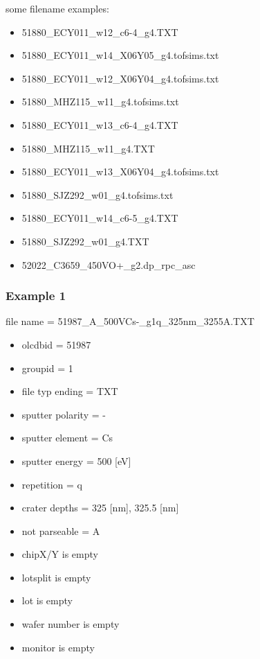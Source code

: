 \documentclass[a4paper,10pt]{article}
\begin{document}
some filename examples:
\begin{itemize}
 \item 51880\_ECY011\_w12\_c6-4\_g4.TXT            
 \item 51880\_ECY011\_w14\_X06Y05\_g4.tofsims.txt
 \item 51880\_ECY011\_w12\_X06Y04\_g4.tofsims.txt  
 \item 51880\_MHZ115\_w11\_g4.tofsims.txt
 \item 51880\_ECY011\_w13\_c6-4\_g4.TXT            
 \item 51880\_MHZ115\_w11\_g4.TXT
 \item 51880\_ECY011\_w13\_X06Y04\_g4.tofsims.txt  
 \item 51880\_SJZ292\_w01\_g4.tofsims.txt
 \item 51880\_ECY011\_w14\_c6-5\_g4.TXT
 \item 51880\_SJZ292\_w01\_g4.TXT
 \item 52022\_C3659\_450VO+\_g2.dp\_rpc\_asc
\end{itemize}


\subsubsection{Example 1}
file name = 51987\_A\_500VCs-\_g1q\_325nm\_3255A.TXT
\begin{itemize}
 \item olcdbid = 51987
 \item groupid = 1
 \item file typ ending = TXT
 \item sputter polarity = -
 \item sputter element = Cs
 \item sputter energy = 500 [eV]
 \item repetition = q
 \item crater depths = 325 [nm], 325.5 [nm]
 \item not parseable = A
 \item chipX/Y is empty
 \item lotsplit is empty
 \item lot is empty
 \item wafer number is empty
 \item monitor is empty
\end{itemize}
\end{document}

